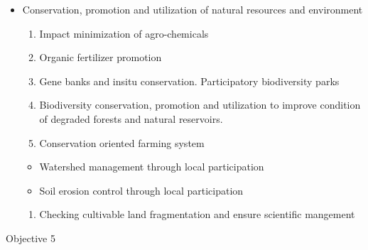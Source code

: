 \documentclass[
  openany]{book}
\providecommand{\tightlist}{%
  \setlength{\itemsep}{0pt}\setlength{\parskip}{0pt}}
\begin{document}
\begin{itemize}
\tightlist
\item
  Conservation, promotion and utilization of natural resources and environment

  \begin{enumerate}
  \def\labelenumi{\arabic{enumi}.}
  \tightlist
  \item
    Impact minimization of agro-chemicals
  \item
    Organic fertilizer promotion
  \item
    Gene banks and insitu conservation. Participatory biodiversity parks
  \item
    Biodiversity conservation, promotion and utilization to improve condition of degraded forests and natural reservoirs.
  \item
    Conservation oriented farming system
  \end{enumerate}

  \begin{itemize}
  \tightlist
  \item
    Watershed management through local participation
  \item
    Soil erosion control through local participation
  \end{itemize}

  \begin{enumerate}
  \def\labelenumi{\arabic{enumi}.}
  \setcounter{enumi}{5}
  \tightlist
  \item
    Checking cultivable land fragmentation and ensure scientific mangement
  \end{enumerate}
\end{itemize}

Objective 5
\end{document}
